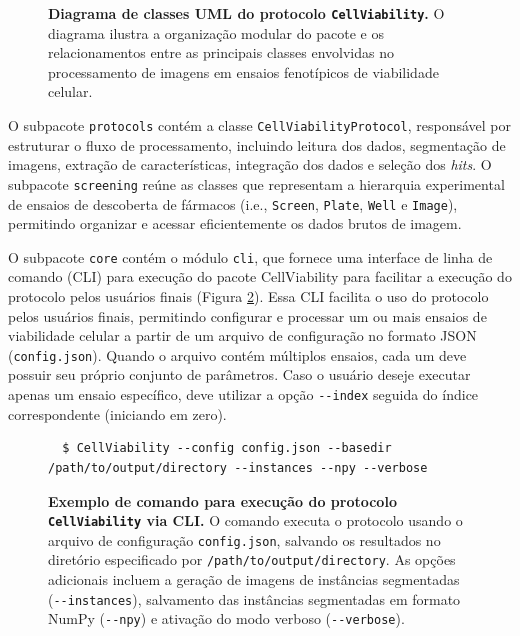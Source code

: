 \documentclass[12pt]{article}
\begin{document}
\begin{figure}[H]
\begin{center}
\begin{tikzpicture}[scale=0.42, every node/.style={transform shape, inner sep=0pt}]
    \end{tikzpicture}
  \end{center}
  \caption{\textbf{Diagrama de classes UML do protocolo \texttt{CellViability}.} O diagrama ilustra a organização modular do pacote e os relacionamentos entre as principais classes envolvidas no processamento de imagens em ensaios fenotípicos de viabilidade celular.}
  \label{fig:cv-uml}
\end{figure}

O subpacote \texttt{protocols} contém a classe \texttt{CellViabilityProtocol}, responsável por estruturar o fluxo de processamento, incluindo leitura dos dados, segmentação de imagens, extração de características, integração dos dados e seleção dos \textit{hits}. O subpacote \texttt{screening} reúne as classes que representam a hierarquia experimental de ensaios de descoberta de fármacos (i.e., \texttt{Screen}, \texttt{Plate}, \texttt{Well} e \texttt{Image}), permitindo organizar e acessar eficientemente os dados brutos de imagem.

O subpacote \texttt{core} contém o módulo \texttt{cli}, que fornece uma interface de linha de comando (CLI) para execução do pacote CellViability para facilitar a execução do protocolo pelos usuários finais (Figura \ref{fig:cli}). Essa CLI facilita o uso do protocolo pelos usuários finais, permitindo configurar e processar um ou mais ensaios de viabilidade celular a partir de um arquivo de configuração no formato JSON (\texttt{config.json}). Quando o arquivo contém múltiplos ensaios, cada um deve possuir seu próprio conjunto de parâmetros. Caso o usuário deseje executar apenas um ensaio específico, deve utilizar a opção \texttt{-{}-index} seguida do índice correspondente (iniciando em zero).

\begin{figure}[ht]
  \begin{verbatim}
  $ CellViability --config config.json --basedir /path/to/output/directory --instances --npy --verbose
  \end{verbatim}
  \caption{\textbf{Exemplo de comando para execução do protocolo \texttt{CellViability} via CLI.} O comando executa o protocolo usando o arquivo de configuração \texttt{config.json}, salvando os resultados no diretório especificado por \texttt{/path/to/output/directory}. As opções adicionais incluem a geração de imagens de instâncias segmentadas (\texttt{-{}-instances}), salvamento das instâncias segmentadas em formato NumPy (\texttt{-{}-npy}) e ativação do modo verboso (\texttt{-{}-verbose}).}
  \label{fig:cli}
\end{figure}
\end{document}
